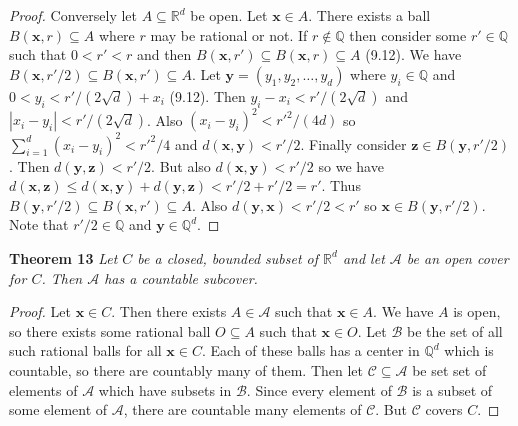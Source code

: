 \documentclass{article}
\begin{document}
\begin{flushleft}
\begin{proof}
Conversely let $A \subseteq \mathbb{R}^d$ be open. Let $\mathbf{x} \in A$. There exists a ball $B(\mathbf{x}, r) \subseteq A$ where $r$ may be rational or not. If $r \notin \mathbb{Q}$ then consider some $r' \in \mathbb{Q}$ such that $0 < r' < r$ and then $B(\mathbf{x}, r') \subseteq B(\mathbf{x}, r) \subseteq A$ (9.12). We have $B(\mathbf{x}, r'/2) \subseteq B(\mathbf{x}, r') \subseteq A$. Let $\mathbf{y} = (y_1, y_2, \dots ,y_d)$ where $y_i \in \mathbb{Q}$ and $0 < y_i < r'/(2\sqrt{d}) + x_i$ (9.12). Then $y_i-x_i < r'/(2\sqrt{d})$ and $|x_i-y_i| < r'/(2\sqrt{d})$. Also $(x_i-y_i)^2 < r'^2/(4d)$ so $\sum_{i=1}^{d} (x_i-y_i)^2 < r'^2/4$ and $d(\mathbf{x}, \mathbf{y}) < r'/2$. Finally consider $\mathbf{z} \in B(\mathbf{y}, r'/2)$. Then $d(\mathbf{y}, \mathbf{z}) < r'/2$. But also $d(\mathbf{x}, \mathbf{y}) < r'/2$ so we have $d(\mathbf{x}, \mathbf{z}) \leq d(\mathbf{x}, \mathbf{y}) + d(\mathbf{y}, \mathbf{z}) < r'/2 + r'/2 = r'$. Thus $B(\mathbf{y}, r'/2) \subseteq B(\mathbf{x}, r') \subseteq A$. Also $d(\mathbf{y}, \mathbf{x}) < r'/2 < r'$ so $\mathbf{x} \in B(\mathbf{y}, r'/2)$. Note that $r'/2 \in \mathbb{Q}$ and $\mathbf{y} \in \mathbb{Q}^d$.
\end{proof}

\textbf{Theorem 13}
\textsl{Let $C$ be a closed, bounded subset of $\mathbb{R}^d$ and let $\mathcal{A}$ be an open cover for $C$. Then $\mathcal{A}$ has a countable subcover.}
\begin{proof}
Let $\mathbf{x} \in C$. Then there exists $A \in \mathcal{A}$ such that $\mathbf{x} \in A$. We have $A$ is open, so there exists some rational ball $O \subseteq A$ such that $\mathbf{x} \in O$. Let $\mathcal{B}$ be the set of all such rational balls for all $\mathbf{x} \in C$. Each of these balls has a center in $\mathbb{Q}^d$ which is countable, so there are countably many of them. Then let $\mathcal{C} \subseteq \mathcal{A}$ be set set of elements of $\mathcal{A}$ which have subsets in $\mathcal{B}$. Since every element of $\mathcal{B}$ is a subset of some element of $\mathcal{A}$, there are countable many elements of $\mathcal{C}$. But $\mathcal{C}$ covers $C$.
\end{proof}


\end{flushleft}
\end{document}
